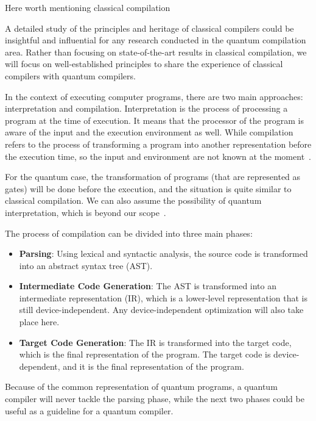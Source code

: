 \documentclass{report}
\begin{document}
Here worth mentioning classical compilation {
A detailed study of the principles and heritage of classical compilers could be insightful and influential for any research conducted in the quantum compilation area. Rather than focusing on state-of-the-art results in classical compilation, we will focus on well-established principles to share the experience of classical compilers with quantum compilers.

In the context of executing computer programs, there are two main approaches: interpretation and compilation. Interpretation is the process of processing a program at the time of execution. It means that the processor of the program is aware of the input and the execution environment as well. While compilation refers to the process of transforming a program into another representation before the execution time, so the input and environment are not known at the moment~\cite[p. 2]{aho1986}.

For the quantum case, the transformation of programs (that are represented as gates) will be done before the execution, and the situation is quite similar to classical compilation. We can also assume the possibility of quantum interpretation, which is beyond our scope~\cite{gay2009}.

The process of compilation can be divided into three main phases:

\begin{itemize}
  \item \textbf{Parsing}: Using lexical and syntactic analysis, the source code is transformed into an abstract syntax tree (AST).

  \item \textbf{Intermediate Code Generation}: The AST is transformed into an intermediate representation (IR), which is a lower-level representation that is still device-independent. Any device-independent optimization will also take place here.

  \item \textbf{Target Code Generation}: The IR is transformed into the target code, which is the final representation of the program. The target code is device-dependent, and it is the final representation of the program.
\end{itemize}

Because of the common representation of quantum programs, a quantum compiler will never tackle the parsing phase, while the next two phases could be useful as a guideline for a quantum compiler.

}
\end{document}
